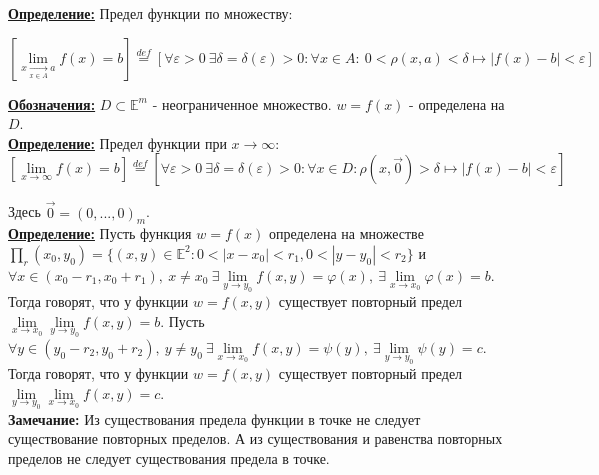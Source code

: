 \documentclass[a4paper,12pt]{article} %
\begin{document}
	\underline{\textbf{Определение:}} Предел функции по множеству:
	
	$$[\lim\limits_{x \xrightarrow[x \in A]{} a}f(x) = b] \stackrel{def}{=} \left[\forall \varepsilon > 0 ~ 
	\exists\delta = \delta(\varepsilon) > 0:
	\forall x \in A: ~ 0 < \rho (x, a) < \delta \mapsto |f(x) - b| < \varepsilon\right]$$
	
	\underline{\textbf{Обозначения:}}
	$D \subset \mathds{E}^m$ - неограниченное множество. $w = f(x)$ - определена на $D$.\\
	
	\underline{\textbf{Определение:}} Предел функции при $x \rightarrow \infty$:
	\\ [2 mm]
	$$[\lim\limits_{x \rightarrow \infty}f(x) = b] \stackrel{def}{=} \left[\forall \varepsilon > 0 ~ 
	\exists\delta = \delta(\varepsilon) > 0:
	\forall x \in D: \rho (x, \vec{0}) > \delta \mapsto |f(x) - b| < \varepsilon\right]$$
	
	\noindent Здесь $\vec{0} = (0, ... , 0)_m$.\\
	
	\underline{\textbf{Определение:}} Пусть функция $w = f(x)$ определена на множестве $\prod_r(x_0, y_0) = 
	\{(x,y) \in \mathds{E}^2: 0 < |x - x_0| < r_1, 0 < |y - y_0| < r_2\}$ и $\forall x \in (x_0 - r_1, x_0 + r_1), ~ x \neq x_0 ~ 
	\exists \lim\limits_{y \to y_0}f(x, y) = \varphi(x), ~ \exists \lim\limits_{x \to x_0}\varphi(x) = b$. Тогда говорят, что у функции $w = f(x, y)$ существует повторный предел $\lim\limits_{x \to x_0} \lim\limits_{y \to y_0}f(x, y) = b$. Пусть $\forall y \in (y_0 - r_2, y_0 + r_2), ~ y \neq y_0 ~ \exists \lim\limits_{x \to x_0}f(x, y) = \psi(y), ~ \exists \lim\limits_{y \to y_0}\psi(y) = c$. Тогда говорят, что у функции $w = f(x, y)$ существует повторный предел $\lim\limits_{y \to y_0} \lim\limits_{x \to x_0}f(x, y) = c$.\\
	
	\textbf{Замечание:} Из существования предела функции в точке не следует существование повторных пределов. 
	А из существования и равенства повторных пределов не следует существования предела в точке.\\
	
\end{document}
